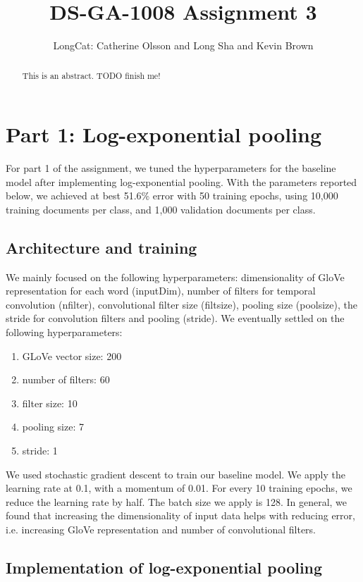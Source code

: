 \documentclass{article}
\title{DS-GA-1008 Assignment 3}
\author{LongCat: Catherine Olsson and Long Sha and Kevin Brown}
\begin{document}
 \maketitle

\begin{abstract}
This is an abstract. TODO finish me!
\end{abstract}

\section*{Part 1: Log-exponential pooling}

For part 1 of the assignment, we tuned the hyperparameters for the baseline model after implementing log-exponential pooling. With the parameters reported below, we achieved at best 51.6\% error with 50 training epochs, using 10,000 training documents per class, and 1,000 validation documents per class. 

\subsection*{Architecture and training}
We mainly focused on the following hyperparameters: dimensionality of GloVe representation for each word (inputDim), number of filters for temporal convolution (nfilter), convolutional filter size (filtsize), pooling size (poolsize), the stride for convolution filters and pooling (stride). We eventually settled on the following hyperparameters:

\begin{enumerate}
\item GLoVe vector size: 200
\item number of filters: 60
\item filter size: 10
\item pooling size: 7
\item stride: 1
\end{enumerate}

We used stochastic gradient descent to train our baseline model. We apply the learning rate at 0.1, with a momentum of 0.01. For every 10 training epochs, we reduce the learning rate by half. The batch size we apply is 128. In general, we found that increasing the dimensionality of input data helps with reducing error, i.e. increasing GloVe representation and number of convolutional filters. 

\subsection*{Implementation of log-exponential pooling} 
\end{document}
